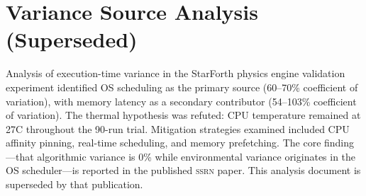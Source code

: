 
\section*{Variance Source Analysis (Superseded)}

Analysis of execution-time variance in the StarForth physics engine validation
experiment identified OS scheduling as the primary source (60--70\% coefficient
of variation), with memory latency as a secondary contributor (54--103\%
coefficient of variation). The thermal hypothesis was refuted: CPU temperature
remained at 27\textdegree C throughout the 90-run trial. Mitigation strategies
examined included CPU affinity pinning, real-time scheduling, and memory
prefetching. The core finding---that algorithmic variance is 0\% while
environmental variance originates in the OS scheduler---is reported in the
published \textsc{ssrn} paper. This analysis document is superseded by that
publication.
